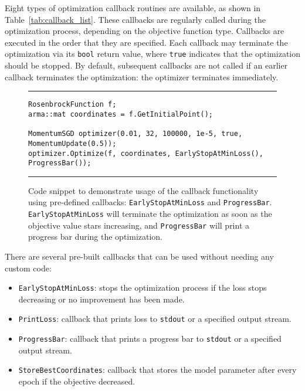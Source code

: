 Eight types of optimization callback routines are available,
as shown in Table~\ref{tab:callback_list}.
These callbacks are regularly called during the optimization process,
depending on the objective function type.
Callbacks are executed in the order that they are specified.
Each callback may terminate the optimization via its {\tt bool} return value,
where {\tt true} indicates that the optimization should be stopped.
By default, subsequent callbacks are not called if an earlier callback terminates
the optimization: the optimizer terminates immediately.

\begin{figure}[b!]
\centering
\hrule
\vspace{1ex}
\begin{verbatim}
RosenbrockFunction f;
arma::mat coordinates = f.GetInitialPoint();

MomentumSGD optimizer(0.01, 32, 100000, 1e-5, true, MomentumUpdate(0.5));
optimizer.Optimize(f, coordinates, EarlyStopAtMinLoss(), ProgressBar());
\end{verbatim}
\hrule
\vspace*{-0.5em}
\caption
  {
  Code snippet to demonstrate usage of the callback functionality using
pre-defined callbacks: \texttt{EarlyStopAtMinLoss} and \texttt{ProgressBar}.
{\tt EarlyStopAtMinLoss} will terminate the optimization as soon as the
objective value stars increasing, and {\tt ProgressBar} will print a progress
bar during the optimization.
  }
\label{fig:example_prog_callbacks}
\end{figure}

There are several pre-built callbacks that can be used without
needing any custom code:

\begin{itemize}
  \item {\tt EarlyStopAtMinLoss}: stops the optimization process if the loss
stops decreasing or no improvement has been made.

  \item {\tt PrintLoss}: callback that prints loss to {\tt stdout} or a
specified output stream.

  \item {\tt ProgressBar}: callback that prints a progress bar to {\tt stdout}
or a specified output stream.

  \item {\tt StoreBestCoordinates}: callback that stores the model parameter
after every epoch if the objective decreased.
\end{itemize}

